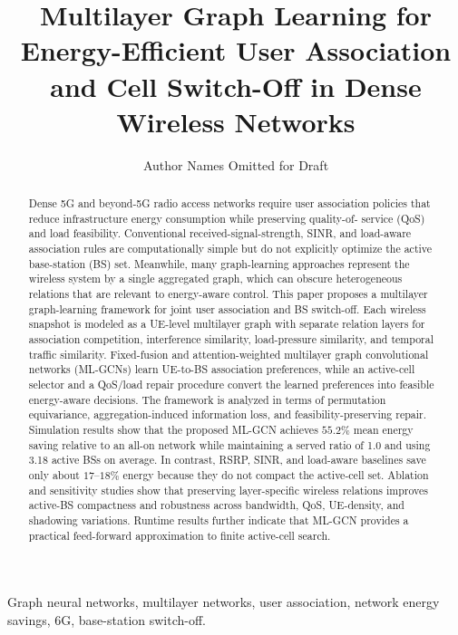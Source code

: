 \documentclass[journal]{IEEEtran}
\title{Multilayer Graph Learning for Energy-Efficient User Association and Cell Switch-Off in Dense Wireless Networks}
\author{Author Names Omitted for Draft}
\begin{document}
\maketitle

\begin{abstract}
Dense 5G and beyond-5G radio access networks require user association policies
that reduce infrastructure energy consumption while preserving quality-of-
service (QoS) and load feasibility. Conventional received-signal-strength,
SINR, and load-aware association rules are computationally simple but do not
explicitly optimize the active base-station (BS) set. Meanwhile, many
graph-learning approaches represent the wireless system by a single aggregated
graph, which can obscure heterogeneous relations that are relevant to
energy-aware control. This paper proposes a multilayer graph-learning framework
for joint user association and BS switch-off. Each wireless snapshot is modeled
as a UE-level multilayer graph with separate relation layers for association
competition, interference similarity, load-pressure similarity, and temporal
traffic similarity. Fixed-fusion and attention-weighted multilayer graph
convolutional networks (ML-GCNs) learn UE-to-BS association preferences, while
an active-cell selector and a QoS/load repair procedure convert the learned
preferences into feasible energy-aware decisions. The framework is analyzed in
terms of permutation equivariance, aggregation-induced information loss, and
feasibility-preserving repair. Simulation results show that the proposed
ML-GCN achieves $55.2\%$ mean energy saving relative to an all-on network while
maintaining a served ratio of 1.0 and using 3.18 active BSs on average. In
contrast, RSRP, SINR, and load-aware baselines save only about $17$--$18\%$
energy because they do not compact the active-cell set. Ablation and
sensitivity studies show that preserving layer-specific wireless relations
improves active-BS compactness and robustness across bandwidth, QoS, UE-density,
and shadowing variations. Runtime results further indicate that ML-GCN provides
a practical feed-forward approximation to finite active-cell search.
\end{abstract}

\begin{IEEEkeywords}
Graph neural networks, multilayer networks, user association, network energy
savings, 6G, base-station switch-off.
\end{IEEEkeywords}
\end{document}
